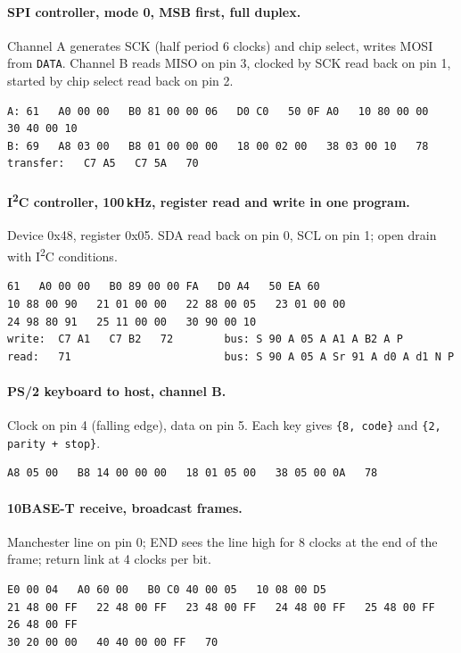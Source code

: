 \documentclass[11pt,a4paper]{article}
\newcommand{\sig}[1]{\texttt{#1}}
\begin{document}
\paragraph{SPI controller, mode 0, MSB first, full duplex.} Channel A generates SCK (half period 6 clocks) and chip select, writes MOSI from \sig{DATA}. Channel B reads MISO on pin 3, clocked by SCK read back on pin 1, started by chip select read back on pin 2.
\begin{lstlisting}
A: 61   A0 00 00   B0 81 00 00 06   D0 C0   50 0F A0   10 80 00 00   30 40 00 10
B: 69   A8 03 00   B8 01 00 00 00   18 00 02 00   38 03 00 10   78
transfer:   C7 A5   C7 5A   70
\end{lstlisting}


\paragraph{I\textsuperscript{2}C controller, 100\,kHz, register read and write in one program.} Device 0x48, register 0x05. SDA read back on pin 0, SCL on pin 1; open drain with I\textsuperscript{2}C conditions.
\begin{lstlisting}
61   A0 00 00   B0 89 00 00 FA   D0 A4   50 EA 60
10 88 00 90   21 01 00 00   22 88 00 05   23 01 00 00
24 98 80 91   25 11 00 00   30 90 00 10
write:  C7 A1   C7 B2   72        bus: S 90 A 05 A A1 A B2 A P
read:   71                        bus: S 90 A 05 A Sr 91 A d0 A d1 N P
\end{lstlisting}


\paragraph{PS/2 keyboard to host, channel B.} Clock on pin 4 (falling edge), data on pin 5. Each key gives \texttt{\{8, code\}} and \texttt{\{2, parity + stop\}}.
\begin{lstlisting}
A8 05 00   B8 14 00 00 00   18 01 05 00   38 05 00 0A   78
\end{lstlisting}


\paragraph{10BASE-T receive, broadcast frames.} Manchester line on pin 0; END sees the line high for 8 clocks at the end of the frame; return link at 4 clocks per bit.
\begin{lstlisting}
E0 00 04   A0 60 00   B0 C0 40 00 05   10 08 00 D5
21 48 00 FF   22 48 00 FF   23 48 00 FF   24 48 00 FF   25 48 00 FF   26 48 00 FF
30 20 00 00   40 40 00 00 FF   70
\end{lstlisting}
\end{document}
